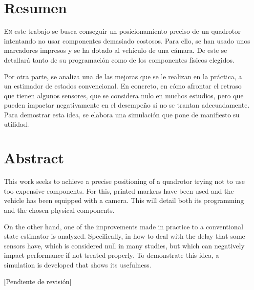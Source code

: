 \chapter*{Resumen}
\pagestyle{especial}
{}



\lettrine[lraise=-0.1, lines=2, loversize=0.2]{E}{n} este trabajo se busca conseguir un posicionamiento preciso de un quadrotor intentando no usar componentes demasiado costosos. Para ello, se han usado unos marcadores impresos y se ha dotado al vehículo de una cámara. De este se detallará tanto de su programación como de los componentes físicos elegidos.

Por otra parte, se analiza una de las mejoras que se le realizan en la práctica, a un estimador de estados convencional. En concreto, en cómo afrontar el retraso que tienen algunos sensores, que se considera nulo en muchos estudios, pero que pueden impactar negativamente en el desempeño si no se trantan adecuadamente. Para demostrar esta idea, se elabora una simulación que pone de manifiesto su utilidad. 



\chapter*{Abstract}
\pagestyle{especial}
{}


This work seeks to achieve a precise positioning of a quadrotor trying not to use too expensive components. For this, printed markers have been used and the vehicle has been equipped with a camera. This will detail both its programming and the chosen physical components.

On the other hand, one of the improvements made in practice to a conventional state estimator is analyzed. Specifically, in how to deal with the delay that some sensors have, which is considered null in many studies, but which can negatively impact performance if not treated properly. To demonstrate this idea, a simulation is developed that shows its usefulness.

{\color{red} [Pendiente de revisión]}


